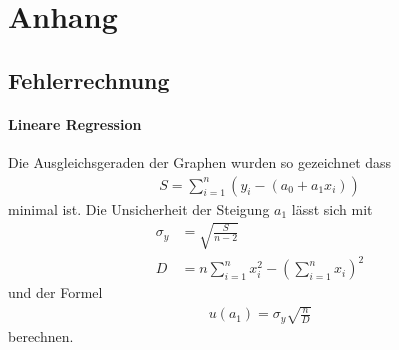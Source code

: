 \documentclass[11pt, a4paper]{article}
\begin{document}
    
   
    \section{Anhang}
    \subsection{Fehlerrechnung}
    \paragraph{Lineare Regression}
    Die Ausgleichsgeraden der Graphen wurden so gezeichnet dass
    \begin{align}
        S=\sum_{i=1}^n(y_i - (a_0 + a_1 x_i))
    \end{align}
    minimal ist. Die Unsicherheit der Steigung $a_1$ lässt sich mit
    \begin{align}
        \sigma_y &= \sqrt{\frac{S}{n-2}} \\
        D &= n \sum_{i=1}^n x_i^2 - \left( \sum_{i=1}^n x_i \right)^2
    \end{align}
    und der Formel
    \begin{align}
        u(a_1) = \sigma_y \sqrt{\frac{n}{D}}
    \end{align}
    berechnen.
\end{document}
